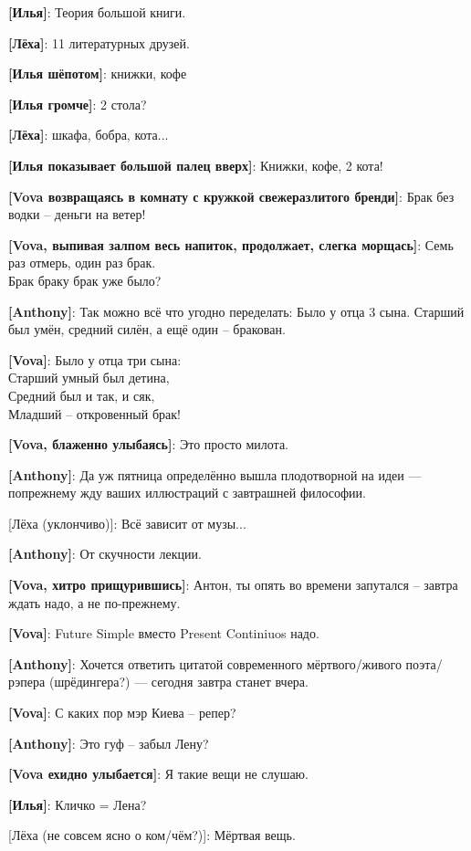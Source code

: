 \begin{flushleft}
\textbf{[Илья]}: Теория большой книги.

\textbf{[Лёха]}: 11 литературных друзей.

\textbf{[Илья шёпотом]}: книжки, кофе

\textbf{[Илья громче]}: 2 стола?

\textbf{[Лёха]}: шкафа, бобра, кота...

\textbf{[Илья показывает большой палец вверх]}: Книжки, кофе, 2 кота!

\textbf{[Vova возвращаясь в комнату с кружкой свежеразлитого бренди]}: Брак без водки -- деньги на ветер!

\textbf{[Vova, выпивая залпом весь напиток, продолжает, слегка морщась]}: Семь раз отмерь, один раз брак.\\

Брак браку брак уже было?

\textbf{[Anthony]}: Так можно всё что угодно переделать: Было у отца 3 сына. Старший был умён, средний силён, а ещё один -- бракован.

\textbf{[Vova]}: Было у отца три сына:\\
Старший умный был детина,\\
Средний был и так, и сяк,\\
Младший -- откровенный брак!

\textbf{[Vova, блаженно улыбаясь]}: Это просто милота.

\textbf{[Anthony]}: Да уж пятница определённо вышла плодотворной на идеи --- попрежнему жду ваших иллюстраций с завтрашней философии.

[Лёха (уклончиво)]: Всё зависит от музы...

\textbf{[Anthony]}: От скучности лекции.

\textbf{[Vova, хитро прищурившись]}: Антон, ты опять во времени запутался -- завтра ждать надо, а не по-прежнему.

\textbf{[Vova]}: Future Simple вместо Present Continiuos надо.

\textbf{[Anthony]}: Хочется ответить цитатой современного мёртвого/живого поэта/рэпера (шрёдингера?) --- сегодня завтра станет вчера.

\textbf{[Vova]}: С каких пор мэр Киева -- репер?

\textbf{[Anthony]}: Это гуф -- забыл Лену?

\textbf{[Vova ехидно улыбается]}: Я такие вещи не слушаю.

\textbf{[Илья]}: Кличко = Лена?

[Лёха (не совсем ясно о ком/чём?)]: Мёртвая вещь.


\end{flushleft}
